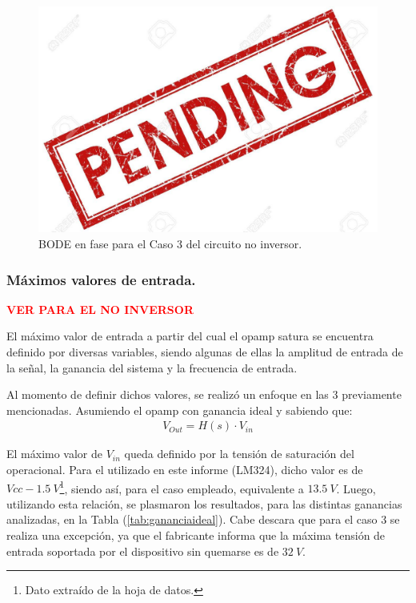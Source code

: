 \begin{figure}[H]	
	\centering
	\includegraphics[width=\textwidth]{ImagenesAux/pend.jpg}
	\caption{BODE en fase para el Caso 3 del circuito no inversor.}
	\label{fig:CompZinphC3}
\end{figure}

\subsubsection{Máximos valores de entrada.}

\begin{center}
\textcolor{red}{\textbf{VER PARA EL NO INVERSOR}}
\end{center}

El máximo valor de entrada a partir del cual el opamp satura se encuentra definido por diversas variables, siendo algunas de ellas la amplitud de entrada de la señal, la ganancia del sistema y la frecuencia de entrada.

Al momento de definir dichos valores, se realizó un enfoque en las 3 previamente mencionadas. Asumiendo el opamp con ganancia ideal y sabiendo que:
\begin{align} V_{Out}=H(s)\cdot V_{in}\end{align}

El máximo valor de $V_{in}$ queda definido por la tensión de saturación del operacional. Para el utilizado en este informe (LM324), dicho valor es de $Vcc - 1.5 \ V$\footnote{Dato extraído de la hoja de datos.}, siendo así, para el caso empleado, equivalente a $13.5 \ V$.
Luego, utilizando esta relación, se plasmaron los resultados, para las distintas ganancias analizadas, en la Tabla (\ref{tab:gananciaideal}). Cabe descara que para el caso 3 se realiza una excepción, ya que el fabricante informa que la máxima tensión de entrada soportada por el dispositivo sin quemarse es de $32 \ V$.

